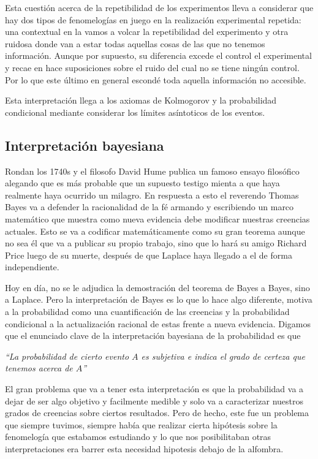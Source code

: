 Esta cuestión acerca de la repetibilidad de los experimentos lleva a considerar que hay dos tipos de fenomelogías en juego en la realización experimental repetida: una contextual en la vamos a volcar la repetibilidad del experimento y otra ruidosa donde van a estar todas aquellas cosas de las que no tenemos información. Aunque por supuesto, su diferencia excede el control el experimental y recae en hace suposiciones sobre el ruido del cual no se tiene ningún control. Por lo que este último en general escondé toda aquella información no accesible.

Esta interpretación llega a los axiomas de Kolmogorov y la probabilidad condicional mediante considerar los límites asíntoticos de los eventos.
\subsection{Interpretación bayesiana}
Rondan los 1740s y el filosofo David Hume publica un famoso ensayo filosófico alegando que es más probable que un supuesto testigo mienta a que haya realmente haya ocurrido un milagro. En respuesta a esto el reverendo Thomas Bayes va a defender la racionalidad de la fé armando y escribiendo un marco matemático que muestra como nueva evidencia debe modificar nuestras creencias actuales. Esto se va a codificar matemáticamente como su gran teorema aunque no sea él que va a publicar su propio trabajo, sino que lo hará su amigo Richard Price luego de su muerte, después de que Laplace haya llegado a el de forma independiente.

Hoy en día, no se le adjudica la demostración del teorema de Bayes a Bayes, sino a Laplace. Pero la interpretación de Bayes es lo que lo hace algo diferente, motiva a la probabilidad como una cuantificación de las creencias y la probabilidad condicional a la actualización racional de estas frente a nueva evidencia. Digamos que el enunciado clave de la interpretación bayesiana de la probabilidad es que 
\begin{center}
    {\it
    ``La probabilidad de cierto evento $A$ es subjetiva e indica el grado de certeza que tenemos acerca de $A$''
    }
    \label{1:eq:laplace}
\end{center}

El gran problema que va a tener esta interpretación es que la probabilidad va a dejar de ser algo objetivo y facilmente medible y solo va a caracterizar nuestros grados de creencias sobre ciertos resultados. Pero de hecho, este fue un problema que siempre tuvimos, siempre había que realizar cierta hipótesis sobre la fenomelogía que estabamos estudiando y lo que nos posibilitaban otras interpretaciones era barrer esta necesidad hipotesis debajo de la alfombra. 

